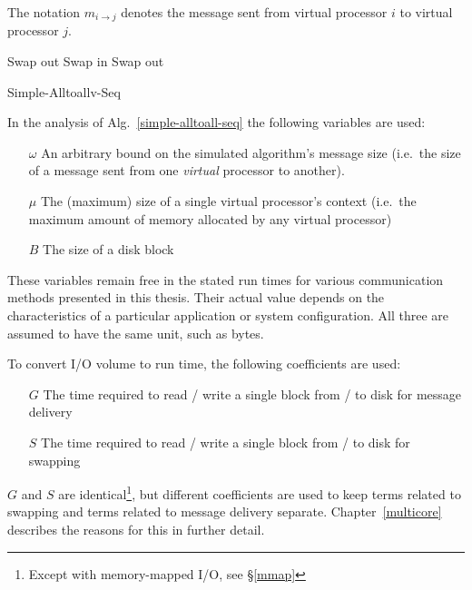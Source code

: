 \documentclass[12pt]{carletoncsthesis}
\begin{document}
The notation $m_{i \rightarrow j}$ denotes the message sent from virtual
processor $i$ to virtual processor $j$.

\begin{algorithm}[h]
\BlankLine
	Swap out\;
\BlankLine{}
\BlankLine
	Swap in\;
	Swap out\;
\BlankLine{}\BlankLine
\caption{{\sc Simple-Alltoallv-Seq}}
\label{simple-alltoall-seq}
\end{algorithm}

In the analysis of Alg.~\ref{simple-alltoall-seq} the following variables are used:
\begin{itemize}
\item[$\omega$ ] An arbitrary bound on the simulated algorithm's message size
(i.e.\ the size of a message sent from one {\em virtual} processor to another).
\item[$\mu$ ] The (maximum) size of a single virtual processor's context
(i.e.\ the maximum amount of memory allocated by any virtual processor)
\item[$B$ ] The size of a disk block
\end{itemize}

These variables remain free in the stated run times for various communication
methods presented in this thesis.  Their actual value depends on the
characteristics of a particular application or system configuration.
All three are assumed to have the same unit, such as bytes.

To convert I/O volume to run time, the following coefficients are used:
\begin{itemize}
\item[$G$ ] The time required to read / write a single block from / to disk
for message delivery
\item[$S$ ] The time required to read / write a single block from / to disk
for swapping
\end{itemize}

$G$ and $S$ are identical\footnote{Except with memory-mapped I/O,
see \S\ref{mmap}}, but different coefficients are used to keep terms
related to swapping and terms related to message delivery separate.
Chapter~\ref{multicore} describes the reasons for this in further detail.
\end{document}
